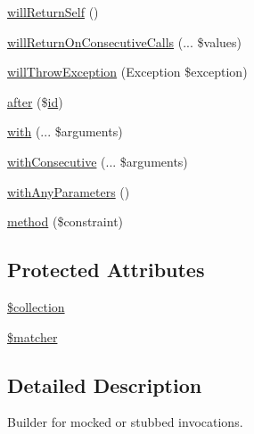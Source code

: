 \begin{DoxyCompactItemize}
\item 
\mbox{\hyperlink{class_p_h_p_unit___framework___mock_object___builder___invocation_mocker_acb4bb039b99907db5e3bc6f883619d0d}{will\+Return\+Self}} ()
\item 
\mbox{\hyperlink{class_p_h_p_unit___framework___mock_object___builder___invocation_mocker_a7ccc2203ff120cd4aea4de2c1ec727fe}{will\+Return\+On\+Consecutive\+Calls}} (... \$values)
\item 
\mbox{\hyperlink{class_p_h_p_unit___framework___mock_object___builder___invocation_mocker_a481af51e917aeb46a3d04d47c4e37d34}{will\+Throw\+Exception}} (Exception \$exception)
\item 
\mbox{\hyperlink{class_p_h_p_unit___framework___mock_object___builder___invocation_mocker_a02176c9b6e2cdc241de069df4423a683}{after}} (\$\mbox{\hyperlink{class_p_h_p_unit___framework___mock_object___builder___invocation_mocker_a6ff64f57bb98d1f8903290a95f22dc43}{id}})
\item 
\mbox{\hyperlink{class_p_h_p_unit___framework___mock_object___builder___invocation_mocker_a9197873aa58b8efb8b5570613a05632b}{with}} (... \$arguments)
\item 
\mbox{\hyperlink{class_p_h_p_unit___framework___mock_object___builder___invocation_mocker_aa86f6761dfcaee547176a5802f693ee8}{with\+Consecutive}} (... \$arguments)
\item 
\mbox{\hyperlink{class_p_h_p_unit___framework___mock_object___builder___invocation_mocker_a9d778819e7c191d54326bf56d1910d7c}{with\+Any\+Parameters}} ()
\item 
\mbox{\hyperlink{class_p_h_p_unit___framework___mock_object___builder___invocation_mocker_a22d53bce8586e7eac1179dca52dfcd55}{method}} (\$constraint)
\end{DoxyCompactItemize}
\subsection*{Protected Attributes}
\begin{DoxyCompactItemize}
\item 
\mbox{\hyperlink{class_p_h_p_unit___framework___mock_object___builder___invocation_mocker_ab9e21dbbe588414048003c715034e2aa}{\$collection}}
\item 
\mbox{\hyperlink{class_p_h_p_unit___framework___mock_object___builder___invocation_mocker_aa136490e36dce53a32ba6e590f7f49ed}{\$matcher}}
\end{DoxyCompactItemize}


\subsection{Detailed Description}
Builder for mocked or stubbed invocations.

